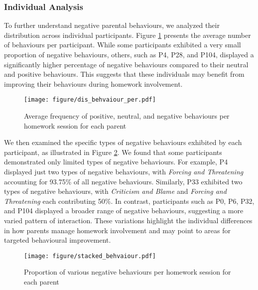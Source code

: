 \subsubsection{Individual Analysis}
To further understand negative parental behaviours, we analyzed their distribution across individual participants. Figure \ref{fig:per_behaviour_dis} presents the average number of behaviours per participant. While some participants exhibited a very small proportion of negative behaviours, others, such as P4, P28, and P104, displayed a significantly higher percentage of negative behaviours compared to their neutral and positive behaviours. This suggests that these individuals may benefit from improving their behaviours during homework involvement.

\begin{figure}
    \centering
    \texttt{[image: figure/dis\_behvaiour\_per.pdf]}
    \caption{Average frequency of positive, neutral, and negative behaviours per homework session for each parent}
    \label{fig:per_behaviour_dis}
\end{figure}

We then examined the specific types of negative behaviours exhibited by each participant, as illustrated in Figure \ref{fig:per_behaviour_stacked}. We found that some participants demonstrated only limited types of negative behaviours. For example, P4 displayed just two types of negative behaviours, with \textit{Forcing and Threatening} accounting for 93.75\% of all negative behaviours. Similarly, P33 exhibited two types of negative behaviours, with \textit{Criticism and Blame} and \textit{Forcing and Threatening} each contributing 50\%. In contrast, participants such as P0, P6, P32, and P104 displayed a broader range of negative behaviours, suggesting a more varied pattern of interaction. These variations highlight the individual differences in how parents manage homework involvement and may point to areas for targeted behavioural improvement.
 
\begin{figure}
    \centering
    \texttt{[image: figure/stacked\_behvaiour.pdf]}
    \caption{Proportion of various negative behaviours per homework session for each parent}
    \label{fig:per_behaviour_stacked}
\end{figure}

